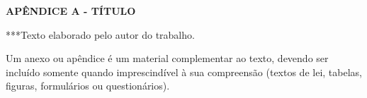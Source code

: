 \appendix

\textbf{\MakeUppercase{APÊNDICE A - TÍTULO}}
\vspace*{0.5cm}

***Texto elaborado pelo autor do trabalho.

Um anexo ou apêndice é um material complementar ao texto, devendo ser incluído somente quando imprescindível à sua compreensão (textos de lei, tabelas, figuras, formulários ou questionários).
